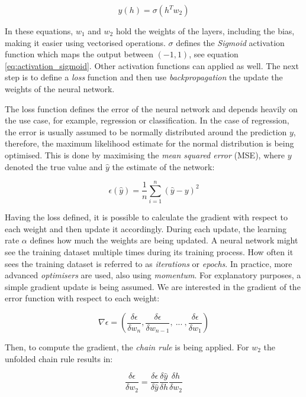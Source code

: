 \documentclass[11pt]{scrartcl}
\begin{document}
\begin{equation}
    y(h) = \sigma(h^T w_2)
\end{equation}

In these equations, $w_1$ and $w_2$ hold the weights of the layers, including the bias, making it easier using vectorised operations. $\sigma$ defines the \textit{Sigmoid} activation function which maps the output between $(-1, 1)$, see equation \ref{eq:activation_sigmoid}. Other activation functions can applied as well. The next step is to define a \textit{loss} function and then use \textit{backpropagation} the update the weights of the neural network.

The loss function defines the error of the neural network and depends heavily on the use case, for example, regression or classification. In the case of regression, the error is usually assumed to be normally distributed around the prediction $y$, therefore, the maximum likelihood estimate for the normal distribution is being optimised. This is done by maximising the \textit{mean squared error} (MSE), where $y$ denoted the true value and $\hat{y}$ the estimate of the network:

\begin{equation}
	\label{eq:mse}
    \epsilon(\hat{y}) = \frac{1}{n} \sum_{i=1}^{n} (\hat{y} - y)^2
\end{equation}

Having the loss defined, it is possible to calculate the gradient with respect to each weight and then update it accordingly. During each update, the learning rate $\alpha$ defines how much the weights are being updated. A neural network might see the training dataset multiple times during its training process. How often it sees the training dataset is referred to as \textit{iterations} or \textit{epochs}. In practice, more advanced \textit{optimisers} are used, also using \textit{momentum}. For explanatory purposes, a simple gradient update is being assumed. We are interested in the gradient of the error function with respect to each weight:

\begin{equation}
    \nabla \epsilon = \left(\frac{\delta \epsilon}{\delta w_n}, \frac{\delta \epsilon}{\delta w_{n-1}},\: ...\:, \frac{\delta \epsilon}{\delta w_1} \right)
\end{equation}

Then, to compute the gradient, the \textit{chain rule} is being applied. For $w_2$ the unfolded chain rule results in:

\begin{equation}
    \frac{\delta \epsilon}{\delta w_2} = \frac{\delta \epsilon}{\delta \hat{y}} \frac{\delta \hat{y}}{\delta h} \frac{\delta h}{\delta w_2}
\end{equation}
\end{document}
